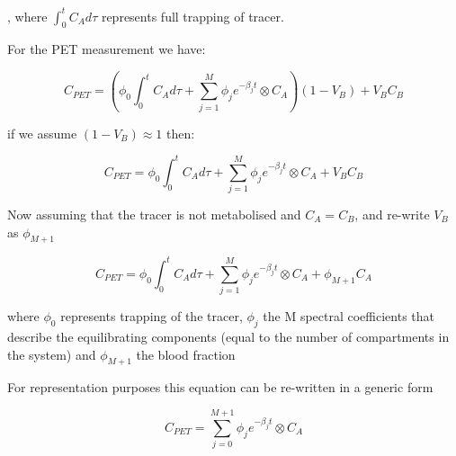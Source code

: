 , where $\int_{0}^{t}C_A  d\tau$ represents full trapping of tracer.

For the PET measurement we have: 

\begin{equation} \label{EqRE}
C_{PET} = ( \phi_0  \int_{0}^{t}C_A  d\tau + \sum_{j=1}^{M} \phi_j e^{-\beta_j t} \otimes C_A  )(1-V_B) + V_B C_B
\end{equation}


if we assume  $(1-V_B)\approx1$ then:

\begin{equation} \label{EqRE}
C_{PET} = \phi_0\int_{0}^{t}C_Ad\tau  + \sum_{j=1}^{M} \phi_j e^{-\beta_j t} \otimes C_A  + V_B C_B
\end{equation}

Now assuming that the tracer is not metabolised and $C_A = C_B$, and re-write $V_B$ as $\phi_{M+1}$

\begin{equation} \label{EqRE}
C_{PET} = \phi_0\int_{0}^{t}C_Ad\tau  + \sum_{j=1}^{M} \phi_j e^{-\beta_j t} \otimes C_A  + \phi_{M+1} C_A
\end{equation}

where $\phi_0$ represents trapping of the tracer, $\phi_j$ the M spectral coefficients that describe the equilibrating components (equal to the number of compartments in the system) and $\phi_{M+1}$ the blood fraction

For representation purposes this equation can be re-written in a generic form 

\begin{equation} \label{EqRE}
C_{PET} = \sum_{j=0}^{M+1} \phi_j e^{-\beta_j t} \otimes C_A 
\end{equation}
